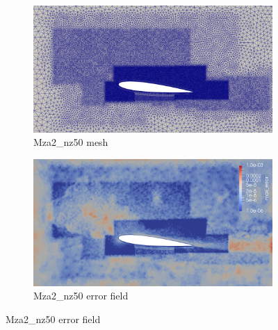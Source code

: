\begin{figure}[H]
\begin{subfigure}[b]{0.475\textwidth}
	\centering
	\includegraphics[width=1\textwidth]{figures/zonal_adapt_results/Mesh_and_error_plots/Mza2_inplane.png}
	\caption{Mza2\_nz50 mesh}
	\label{fig:zonal_Mza2_mesh}
\end{subfigure}
\begin{subfigure}[b]{0.475\textwidth}
	\centering
	\includegraphics[width=1\textwidth]{figures/zonal_adapt_results/Mesh_and_error_plots/Mza2_error.png}
	\caption{Mza2\_nz50 error field}
	\label{fig:zonal_Mza2_error}
\end{subfigure}


\end{figure}

